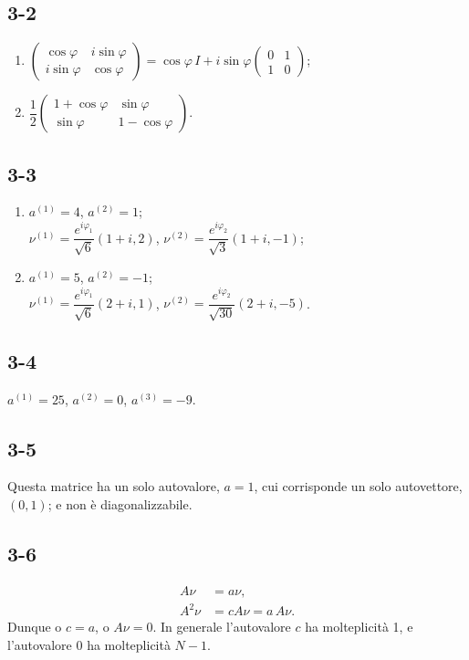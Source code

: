\documentclass[11pt, a4paper]{book}
\numberwithin{equation}{section}
\begin{document}

\subsection*{3-2}
\begin{enumerate}
  \item
    $\begin{pmatrix} \cos\varphi & i\sin\varphi \\ i\sin\varphi & \cos\varphi \end{pmatrix}
    = \cos\varphi\, I + i\sin\varphi \begin{pmatrix} 0 & 1 \\ 1 & 0 \end{pmatrix}$;
  \item
    $\dfrac{1}{2}\begin{pmatrix} 1+\cos\varphi & \sin\varphi \\ \sin\varphi & 1-\cos\varphi \end{pmatrix}$.
\end{enumerate}

\subsection*{3-3}
\begin{enumerate}
  \item $a^{(1)} = 4$, $a^{(2)} = 1$;\\
    $\nu^{(1)} = \dfrac{e^{i\varphi_1}}{\sqrt{6}}(1+i, 2)$, \quad
    $\nu^{(2)} = \dfrac{e^{i\varphi_2}}{\sqrt{3}}(1+i, -1)$;
  \item $a^{(1)} = 5$, $a^{(2)} = -1$;\\
    $\nu^{(1)} = \dfrac{e^{i\varphi_1}}{\sqrt{6}}(2+i, 1)$, \quad
    $\nu^{(2)} = \dfrac{e^{i\varphi_2}}{\sqrt{30}}(2+i, -5)$.
\end{enumerate}

\subsection*{3-4}
$a^{(1)} = 25$, $a^{(2)} = 0$, $a^{(3)} = -9$.

\subsection*{3-5}
Questa matrice ha un solo autovalore, $a=1$, cui corrisponde un solo
autovettore, $(0,1)$; e non è diagonalizzabile.

\subsection*{3-6}
\begin{align*}
A\nu &= a\nu, \\
A^2\nu &= cA\nu = a\,A\nu.
\end{align*}
Dunque o $c=a$, o $A\nu=0$. In generale l'autovalore $c$ ha
molteplicità 1, e l'autovalore $0$ ha molteplicità $N-1$.
\end{document}

